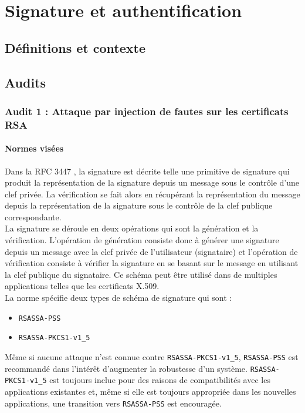 \chapter{Signature et authentification}
\section{Définitions et contexte}

\section{Audits}
	\subsection{Audit 1 : Attaque par injection de fautes sur les certificats RSA}
		\subsubsection{Normes visées}
Dans la RFC 3447 \cite{rfc3447}, la signature est décrite telle une primitive de signature qui produit la représentation de la signature depuis un message sous le contrôle d'une clef privée. La vérification se fait alors en récupérant la représentation du message depuis la représentation de la signature sous le contrôle de la clef publique correspondante.\\

La signature se déroule en  deux opérations qui sont la génération et la vérification. L'opération de génération consiste donc à générer une signature depuis un message avec la clef privée de l'utilisateur (signataire) et l'opération de vérification consiste à vérifier la signature en se basant sur le message en utilisant la clef publique du signataire. 
Ce schéma peut être utilisé dans de multiples applications telles que les certificats X.509.\\


La norme spécifie deux types de schéma de signature qui sont :
\begin{itemize}
\item \texttt{RSASSA-PSS}
\item \texttt{RSASSA-PKCS1-v1\_5} \\
\end{itemize}

Même si aucune attaque n'est connue contre \texttt{RSASSA-PKCS1-v1\_5},  \texttt{RSASSA-PSS} est recommandé dans l'intérêt d'augmenter la robustesse d'un système. \texttt{RSASSA-PKCS1-v1\_5} est toujours inclue pour des raisons de compatibilités avec les applications existantes et, même si elle est toujours appropriée dans les nouvelles applications, une transition vers \texttt{RSASSA-PSS} est encouragée.\\ 


